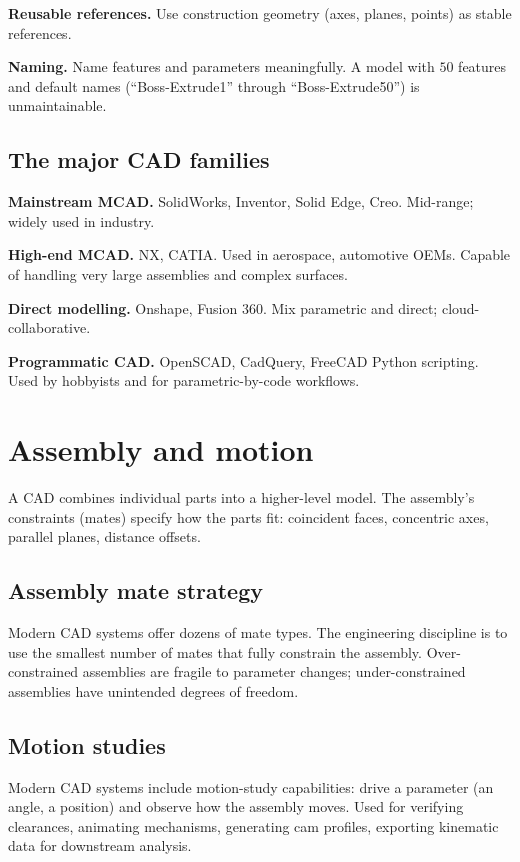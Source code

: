 \textbf{Reusable references.} Use construction geometry (axes, planes, points) as stable references.

\textbf{Naming.} Name features and parameters meaningfully. A model with $50$ features and default names (``Boss-Extrude1'' through ``Boss-Extrude50'') is unmaintainable.

\subsection{The major CAD families}

\textbf{Mainstream MCAD.} SolidWorks, Inventor, Solid Edge, Creo. Mid-range; widely used in industry.

\textbf{High-end MCAD.} NX, CATIA. Used in aerospace, automotive OEMs. Capable of handling very large assemblies and complex surfaces.

\textbf{Direct modelling.} Onshape, Fusion 360. Mix parametric and direct; cloud-collaborative.

\textbf{Programmatic CAD.} OpenSCAD, CadQuery, FreeCAD Python scripting. Used by hobbyists and for parametric-by-code workflows.

\section{Assembly and motion}

A CAD  combines individual parts into a higher-level model. The assembly's constraints (mates) specify how the parts fit: coincident faces, concentric axes, parallel planes, distance offsets.

\subsection{Assembly mate strategy}

Modern CAD systems offer dozens of mate types. The engineering discipline is to use the smallest number of mates that fully constrain the assembly. Over-constrained assemblies are fragile to parameter changes; under-constrained assemblies have unintended degrees of freedom.

\subsection{Motion studies}

Modern CAD systems include motion-study capabilities: drive a parameter (an angle, a position) and observe how the assembly moves. Used for verifying clearances, animating mechanisms, generating cam profiles, exporting kinematic data for downstream analysis.

